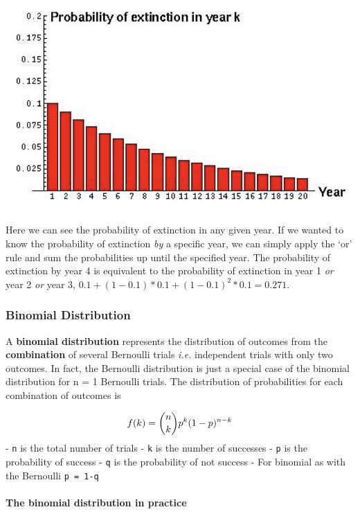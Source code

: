 \documentclass[
]{book}
\begin{document}
\begin{center}\includegraphics[width=0.8\linewidth]{images/prob.017} \end{center}

Here we can see the probability of extinction in any given year. If we wanted to know the probability of extinction \emph{by} a specific year, we can simply apply the `or' rule and sum the probabilities up until the specified year. The probability of extinction by year 4 is equivalent to the probability of extinction in year 1 \emph{or} year 2 \emph{or} year 3, \(0.1 + (1 - 0.1)*0.1 + (1 - 0.1)^2*0.1 = 0.271\).

\hypertarget{binomial-distribution}{%
\subsubsection{\texorpdfstring{\textbf{Binomial Distribution}}{Binomial Distribution}}\label{binomial-distribution}}

A \textbf{binomial distribution} represents the distribution of outcomes from the \textbf{combination} of several Bernoulli trials \emph{i.e.} independent trials with only two outcomes. In fact, the Bernoulli distribution is just a special case of the binomial distribution for n = 1 Bernoulli trials. The distribution of probabilities for each combination of outcomes is

\[\large f(k) = {n \choose k} p^{k} (1-p)^{n-k}\]
- \texttt{n} is the total number of trials
- \texttt{k} is the number of successes
- \texttt{p} is the probability of success
- \texttt{q} is the probability of not success
- For binomial as with the Bernoulli \texttt{p\ =\ 1-q}

\hypertarget{the-binomial-distribution-in-practice}{%
\paragraph{\texorpdfstring{The \textbf{binomial distribution} in practice}{The binomial distribution in practice}}\label{the-binomial-distribution-in-practice}}
\end{document}
